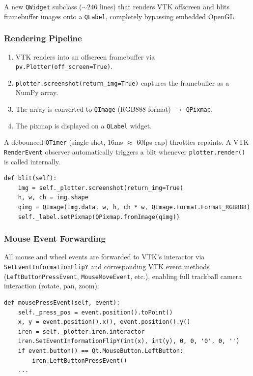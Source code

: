 \documentclass[11pt,a4paper]{article}
\begin{document}
A new \texttt{QWidget} subclass (${\sim}246$ lines) that renders VTK offscreen and blits framebuffer images onto a \texttt{QLabel}, completely bypassing embedded OpenGL.

\subsubsection{Rendering Pipeline}

\begin{enumerate}[nosep]
    \item VTK renders into an offscreen framebuffer via \texttt{pv.Plotter(off\_screen=True)}.
    \item \texttt{plotter.screenshot(return\_img=True)} captures the framebuffer as a NumPy array.
    \item The array is converted to \texttt{QImage} (RGB888 format) $\to$ \texttt{QPixmap}.
    \item The pixmap is displayed on a \texttt{QLabel} widget.
\end{enumerate}

A debounced \texttt{QTimer} (single-shot, 16ms $\approx$ 60fps cap) throttles repaints. A VTK \texttt{RenderEvent} observer automatically triggers a blit whenever \texttt{plotter.render()} is called internally.

\begin{lstlisting}
def blit(self):
    img = self._plotter.screenshot(return_img=True)
    h, w, ch = img.shape
    qimg = QImage(img.data, w, h, ch * w, QImage.Format.Format_RGB888)
    self._label.setPixmap(QPixmap.fromImage(qimg))
\end{lstlisting}

\subsubsection{Mouse Event Forwarding}

All mouse and wheel events are forwarded to VTK's interactor via \texttt{SetEventInformationFlipY} and corresponding VTK event methods (\texttt{LeftButtonPressEvent}, \texttt{MouseMoveEvent}, etc.), enabling full trackball camera interaction (rotate, pan, zoom):

\begin{lstlisting}
def mousePressEvent(self, event):
    self._press_pos = event.position().toPoint()
    x, y = event.position().x(), event.position().y()
    iren = self._plotter.iren.interactor
    iren.SetEventInformationFlipY(int(x), int(y), 0, 0, '0', 0, '')
    if event.button() == Qt.MouseButton.LeftButton:
        iren.LeftButtonPressEvent()
    ...
\end{lstlisting}
\end{document}
